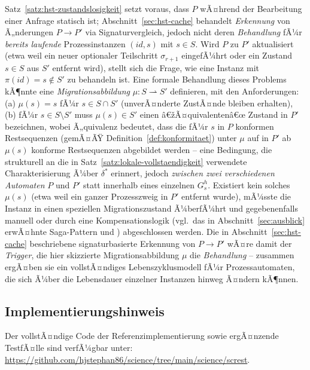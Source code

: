 ﻿\documentclass[a4paper,12pt]{article}
\theoremstyle{definition}
\begin{document}
Satz~\ref{satz:hst-zustandslosigkeit} setzt voraus, dass $P$ wÃ¤hrend der Bearbeitung
einer Anfrage statisch ist; Abschnitt~\ref{sec:hst-cache} behandelt \emph{Erkennung} von
Ã„nderungen $P\to P'$ via Signaturvergleich, jedoch nicht deren \emph{Behandlung} fÃ¼r
\emph{bereits laufende} Prozessinstanzen $(id,s)$ mit $s\in S$. Wird $P$ zu $P'$
aktualisiert (etwa weil ein neuer optionaler Teilschritt $\sigma_{r+1}$ eingefÃ¼hrt oder
ein Zustand $s\in S$ aus $S'$ entfernt wird), stellt sich die Frage, wie eine Instanz mit
$\pi(id)=s\notin S'$ zu behandeln ist. Eine formale Behandlung dieses Problems kÃ¶nnte
eine \emph{Migrationsabbildung} $\mu: S\rightharpoonup S'$ definieren, mit den
Anforderungen: (a) $\mu(s)=s$ fÃ¼r $s\in S\cap S'$ (unverÃ¤nderte ZustÃ¤nde bleiben
erhalten), (b) fÃ¼r $s\in S\setminus S'$ muss $\mu(s)\in S'$ einen â€žÃ¤quivalentenâ€œ Zustand
in $P'$ bezeichnen, wobei Ã„quivalenz bedeutet, dass die fÃ¼r $s$ in $P$ konformen
Restsequenzen (gemÃ¤ÃŸ Definition~\ref{def:konformitaet}) unter $\mu$ auf in $P'$ ab
$\mu(s)$ konforme Restsequenzen abgebildet werden -- eine Bedingung, die strukturell an
die in Satz~\ref{satz:lokale-vollstaendigkeit} verwendete Charakterisierung Ã¼ber
$\delta^{*}$ erinnert, jedoch \emph{zwischen zwei verschiedenen Automaten} $P$ und $P'$
statt innerhalb eines einzelnen $G_s^h$. Existiert kein solches $\mu(s)$ (etwa weil ein
ganzer Prozesszweig in $P'$ entfernt wurde), mÃ¼sste die Instanz in einen speziellen
Migrationszustand Ã¼berfÃ¼hrt und gegebenenfalls manuell oder durch eine
Kompensationslogik (vgl.\ das in Abschnitt~\ref{sec:ausblick} erwÃ¤hnte Saga-Pattern und
\cite{garcia1987}) abgeschlossen werden. Die in Abschnitt~\ref{sec:hst-cache}
beschriebene signaturbasierte Erkennung von $P\to P'$ wÃ¤re damit der \emph{Trigger}, die
hier skizzierte Migrationsabbildung $\mu$ die \emph{Behandlung} -- zusammen ergÃ¤ben sie
ein vollstÃ¤ndiges Lebenszyklusmodell fÃ¼r Prozessautomaten, die sich Ã¼ber die Lebensdauer
einzelner Instanzen hinweg Ã¤ndern kÃ¶nnen.

\subsection{Implementierungshinweis}

Der vollstÃ¤ndige Code der Referenzimplementierung sowie ergÃ¤nzende TestfÃ¤lle sind
verfÃ¼gbar unter: \url{https://github.com/hjstephan86/science/tree/main/science/screst}.
\end{document}
